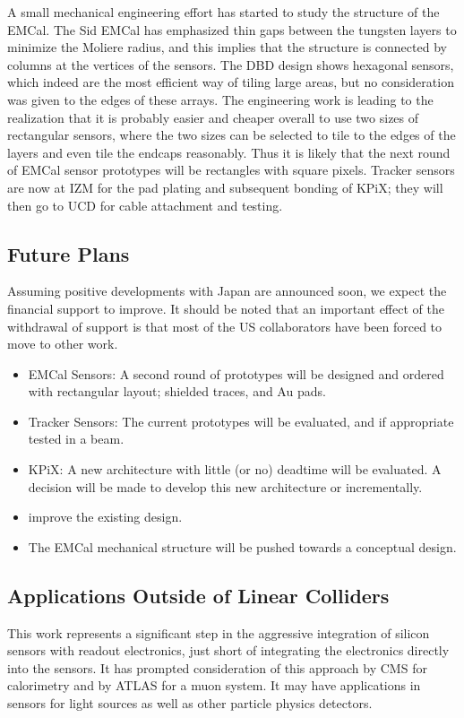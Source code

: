 A small mechanical engineering effort has started to study the structure of the EMCal. The Sid EMCal has emphasized thin gaps between the tungsten layers to minimize the Moliere radius, and this implies that the structure is connected by columns at the vertices of the sensors. The DBD design shows hexagonal sensors, which indeed are the most efficient way of tiling large areas, but no consideration was given to the edges of these arrays. The engineering work is leading to the realization that it is probably easier and cheaper overall to use two sizes of rectangular sensors, where the two sizes can be selected to tile to the edges of the layers and even tile the endcaps reasonably. Thus it is likely that the next round of EMCal sensor prototypes will be rectangles with square pixels.
Tracker sensors are now at IZM for the pad plating and subsequent bonding of KPiX; they will then go to UCD for cable attachment and testing.
\subsection{Future Plans}
Assuming positive developments with Japan are announced soon, we expect the financial support to improve. It should be noted that an important effect of the withdrawal of support is that most of the US collaborators have been forced to move to other work. 
\begin{itemize}
	\item EMCal Sensors: A second round of prototypes will be designed and ordered with rectangular layout; shielded traces, and Au pads.
	\item Tracker Sensors: The current prototypes will be evaluated, and if appropriate tested in a beam.
	\item KPiX: A new architecture with little (or no) deadtime will be evaluated. A decision will be made to develop this new architecture or incrementally.
	\item improve the existing design.
	\item The EMCal mechanical structure will be pushed towards a conceptual design.
\end{itemize}
\subsection{Applications Outside of Linear Colliders}
This work represents a significant step in the aggressive integration of silicon sensors with readout electronics, just short of integrating the electronics directly into the sensors. It has prompted consideration of this approach by CMS for calorimetry and by ATLAS for a muon system.  It may have applications in sensors for light sources as well as other particle physics detectors.
